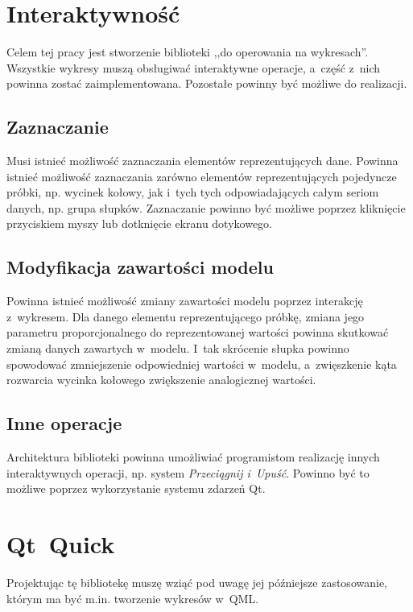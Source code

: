 \section{Interaktywność}
Celem tej pracy jest stworzenie biblioteki ,,do operowania na wykresach''. Wszystkie wykresy muszą obsługiwać interaktywne operacje, a~część z~nich powinna zostać zaimplementowana. Pozostałe powinny być możliwe do realizacji.

\subsection{Zaznaczanie}
Musi istnieć możliwość zaznaczania elementów reprezentujących dane. Powinna istnieć możliwość zaznaczania zarówno elementów reprezentujących pojedyncze próbki, np. wycinek kołowy, jak i~tych tych odpowiadających całym seriom danych, np. grupa słupków. Zaznaczanie powinno być możliwe poprzez kliknięcie przyciskiem myszy lub dotknięcie ekranu dotykowego.

\subsection{Modyfikacja zawartości modelu}
Powinna istnieć możliwość zmiany zawartości modelu poprzez interakcję z~wykresem. Dla danego elementu reprezentującego próbkę, zmiana jego parametru proporcjonalnego do reprezentowanej wartości powinna skutkować zmianą danych zawartych w~modelu. I~tak skrócenie słupka powinno spowodować zmniejszenie odpowiedniej wartości w~modelu, a~zwięszkenie kąta rozwarcia wycinka kołowego zwiększenie analogicznej wartości.

\subsection{Inne operacje}
Architektura biblioteki powinna umożliwiać programistom realizację innych interaktywnych operacji, np. system \textit{Przeciągnij i~Upuść}. Powinno być to możliwe poprzez wykorzystanie systemu zdarzeń Qt.



\section{Qt~Quick}
Projektując tę bibliotekę muszę wziąć pod uwagę jej późniejsze zastosowanie, którym ma być m.in. tworzenie wykresów w~QML. 

